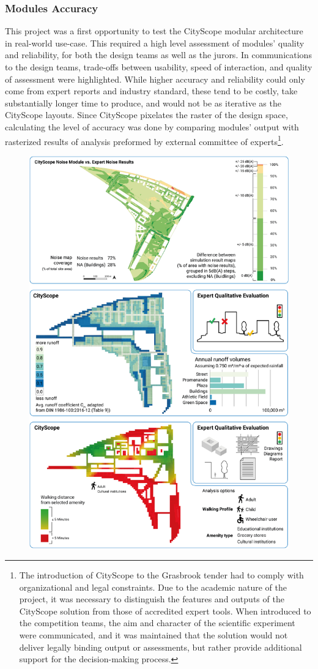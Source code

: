 {{        \subsubsection{Modules Accuracy}
        {
            This project was a first opportunity to test the CityScope modular architecture in real-world use-case. This required a high level assessment of modules' quality and reliability, for both the design teams as well as the jurors. In communications to the design teams, trade-offs between usability, speed of interaction, and quality of assessment were highlighted.
            While higher accuracy and reliability could only come from expert reports and industry standard, these tend to be costly, take substantially longer time to produce, and would not be as iterative as the CityScope layouts. Since CityScope pixelates the raster of the design space, calculating the level of accuracy was done by comparing modules' output with rasterized results of analysis preformed by external committee of experts\footnote{The introduction of CityScope to the Grasbrook tender had to comply with organizational and legal constraints. Due to the academic nature of the project, it was necessary to distinguish the features and outputs of the CityScope solution from those of accredited expert tools. When introduced to the competition teams, the aim and character of the scientific experiment were communicated, and it was maintained that the solution would not deliver legally binding output or assessments, but rather provide additional support for the decision-making process.}.
        }



        \begin{figure}[!h]
            \begin{center}
                \includegraphics[width=.7\textwidth]{chapters/transformation/grasbrook/figures/grsbrk0.png}


\end{center}
\end{figure}}}
